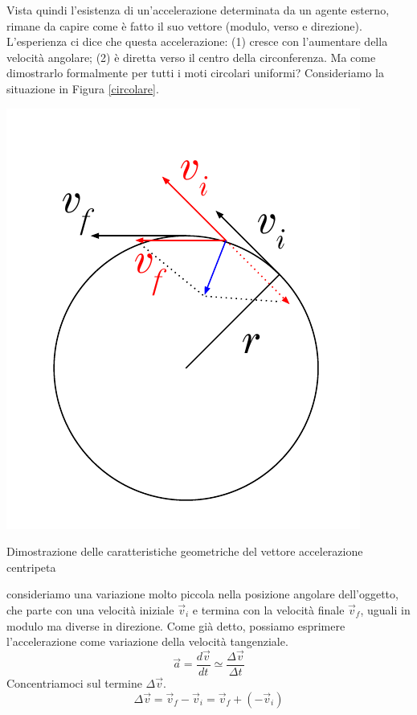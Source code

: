 Vista quindi l'esistenza di un'accelerazione determinata da un agente esterno,
rimane da capire come è fatto il suo vettore (modulo, verso e direzione).
L'esperienza ci dice che questa accelerazione: (1) cresce con l'aumentare della
velocità angolare; (2) è diretta verso il centro della circonferenza. Ma come
dimostrarlo formalmente per tutti i moti circolari uniformi? Consideriamo la
situazione in Figura \ref{circolare}.
\begin{marginfigure}
    \centering
    \includegraphics[width = \marginparwidth]{figures/circolare.pdf}
    \caption{Dimostrazione delle caratteristiche geometriche del vettore accelerazione centripeta}
    \label{circolare}
\end{marginfigure}
consideriamo una variazione molto piccola nella posizione angolare dell'oggetto,
che parte con una velocità iniziale $\overrightarrow{v}_i$ e termina con la
velocità finale $\overrightarrow{v}_f$, uguali in modulo ma diverse in direzione.
Come già detto, possiamo esprimere l'accelerazione come variazione della
velocità tangenziale.
\[ \overrightarrow{a} = \frac{d\overrightarrow{v}}{dt} \simeq \frac{\Delta\overrightarrow{v}}{\Delta t} \]
Concentriamoci sul termine $\Delta\overrightarrow{v}$.
\[ \Delta\overrightarrow{v} = \overrightarrow{v}_f - \overrightarrow{v}_i = \overrightarrow{v}_f + (-\overrightarrow{v}_i) \]
